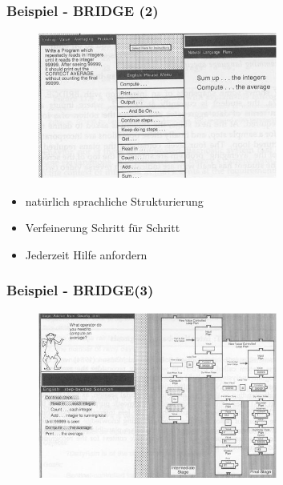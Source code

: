 \documentclass{beamer}
\begin{document}
\begin{frame}
  \frametitle{Beispiel - BRIDGE (2)}
  \begin{figure}
    \centering
    \includegraphics[width=0.7\textwidth]{../bilder/bridge1.jpg}
  \end{figure}

  \begin{itemize}
    \item natürlich sprachliche Strukturierung
    \item Verfeinerung Schritt für Schritt
    \item Jederzeit Hilfe anfordern
  \end{itemize}
\end{frame}

\begin{frame}
    \frametitle{Beispiel - BRIDGE(3)}
    \begin{figure}
      \centering
      \includegraphics[width=0.7\textwidth]{../bilder/bridge2.jpg}
    \end{figure}
\end{frame}
\end{document}
